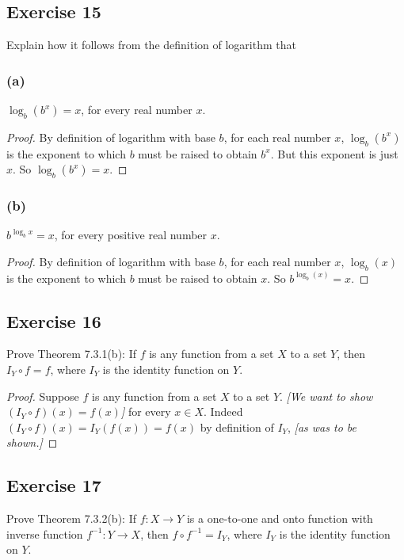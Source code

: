 \documentclass[14pt]{extarticle}
\begin{document}
\subsection{Exercise 15}
Explain how it follows from the definition of logarithm that

\subsubsection{(a)}
\(\log_b(b^x) = x\), for every real number $x$.

\begin{proof}
    By definition of logarithm with base $b$, for each real number $x$, \(\log_b(b^x)\) is the exponent to which $b$
    must be raised to obtain $b^x$. But this exponent is just $x$. So \(\log_b(b^x) = x\).
\end{proof}

\subsubsection{(b)}
\(b^{\log_b x} = x\), for every positive real number $x$.

\begin{proof}
    By definition of logarithm with base $b$, for each real number $x$, \(\log_b(x)\) is the exponent to which $b$
    must be raised to obtain $x$. So \(b^{\log_b(x)} = x\).
\end{proof}

\subsection{Exercise 16}
Prove Theorem 7.3.1(b): If $f$ is any function from a set $X$ to a set $Y$, then \(I_Y \circ f = f\), where $I_Y$ is
the identity function on $Y$.

\begin{proof}
    Suppose $f$ is any function from a set $X$ to a set $Y$. {\it [We want to show \((I_Y \circ f)(x) = f(x)\)]} for
    every \(x \in X\). Indeed \((I_Y \circ f)(x) = I_Y(f(x)) = f(x)\) by definition of $I_Y$, {\it [as was to be shown.]}
\end{proof}

\subsection{Exercise 17}
Prove Theorem 7.3.2(b): If \(f: X \to Y\) is a one-to-one and onto function with inverse function \(f^{-1}:Y \to X\),
then \(f \circ f^{-1} = I_Y\), where \(I_Y\) is the identity function on $Y$.
\end{document}

